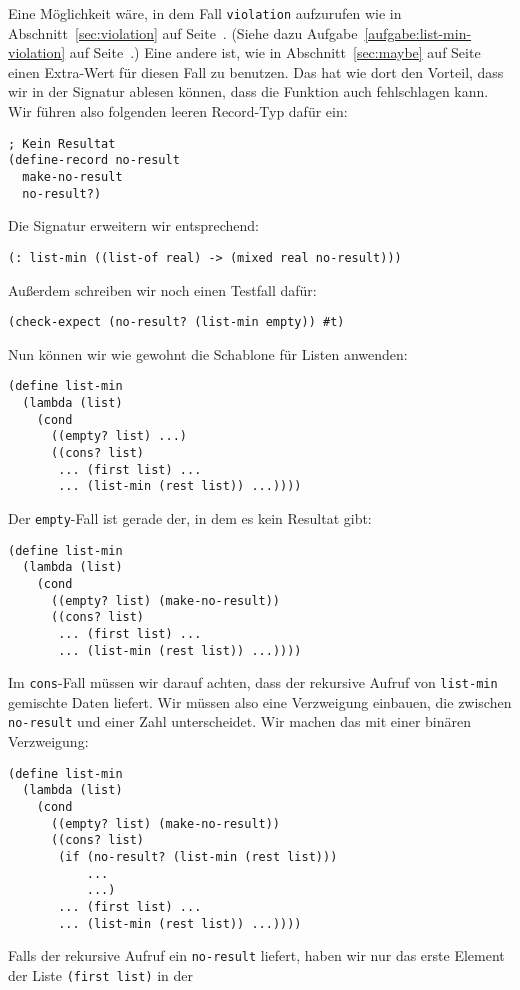 Eine Möglichkeit wäre, in dem Fall \lstinline{violation} aufzurufen
wie in Abschnitt~\ref{sec:violation} auf
Seite~\pageref{sec:violation}.  (Siehe dazu
Aufgabe~\ref{aufgabe:list-min-violation} auf
Seite~\pageref{aufgabe:list-min-violation}.)  Eine andere ist, wie in
Abschnitt~\ref{sec:maybe} auf Seite~\pageref{sec:maybe} einen
Extra-Wert für diesen Fall zu benutzen.  Das hat wie dort den Vorteil,
dass wir in der Signatur ablesen können, dass die Funktion auch
fehlschlagen kann.  Wir führen also folgenden leeren Record-Typ dafür
ein:
%
\begin{lstlisting}
; Kein Resultat
(define-record no-result
  make-no-result
  no-result?)
\end{lstlisting}
%
Die Signatur erweitern wir entsprechend:
%
\begin{lstlisting}
(: list-min ((list-of real) -> (mixed real no-result)))
\end{lstlisting}
%
Außerdem schreiben wir noch einen Testfall dafür:
%
\begin{lstlisting}
(check-expect (no-result? (list-min empty)) #t)
\end{lstlisting}
%
Nun können wir wie gewohnt die Schablone für Listen anwenden:
%
\begin{lstlisting}
(define list-min
  (lambda (list)
    (cond
      ((empty? list) ...)
      ((cons? list)
       ... (first list) ...
       ... (list-min (rest list)) ...))))
\end{lstlisting}
%
Der \lstinline{empty}-Fall ist gerade der, in dem es kein Resultat
gibt:
%
\begin{lstlisting}
(define list-min
  (lambda (list)
    (cond
      ((empty? list) (make-no-result))
      ((cons? list)
       ... (first list) ...
       ... (list-min (rest list)) ...))))
\end{lstlisting}
%
Im \lstinline{cons}-Fall müssen wir darauf achten, dass der rekursive
Aufruf von \lstinline{list-min} gemischte Daten liefert.  Wir müssen
also eine Verzweigung einbauen, die zwischen \lstinline{no-result} und
einer Zahl unterscheidet.  Wir machen das mit einer binären Verzweigung:
%
\begin{lstlisting}
(define list-min
  (lambda (list)
    (cond
      ((empty? list) (make-no-result))
      ((cons? list)
       (if (no-result? (list-min (rest list)))
           ...
           ...)
       ... (first list) ...
       ... (list-min (rest list)) ...))))
\end{lstlisting}
%
Falls der rekursive Aufruf ein \lstinline{no-result} liefert, haben
wir nur das erste Element der Liste \lstinline{(first list)} in der
